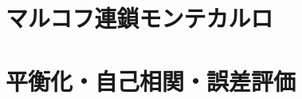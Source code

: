 \documentclass[10pt,dvipdfmx]{beamer}
\begin{document}



%


%
%

\section{マルコフ連鎖モンテカルロ}











\section{平衡化・自己相関・誤差評価}







%
\end{document}
